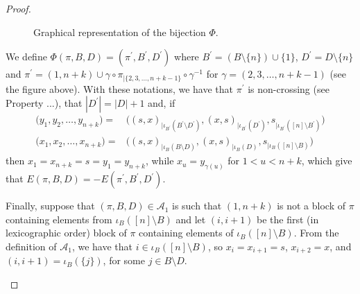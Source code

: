 \documentclass{amsart}
\begin{document}
\begin{proof}
\begin{center}
{\begin{figure}[H]
\begin{tikzpicture}
  \end{tikzpicture}
  \caption{Graphical representation of the bijection $\Phi$.}
  \label{fig:4}
  \end{figure}
}
  \end{center}
    We define
   $ \Phi(\pi, B, D) = (\pi^\prime, B^\prime, D^\prime)$
   where
   $ B^\prime = ( B \setminus \{n\} ) \cup \{1\}$,
   $ D^\prime = D \setminus \{n\} $
   and
   $ \pi^\prime  = (1, n+k) \cup \gamma \circ \pi_{| \{2, 3, \dots, n+k-1\}} \circ \gamma^{-1}$ 
   for
    $ \gamma = (2, 3, \dots, n+k-1)$ (see the figure above).
    With these notations, we have that
    $ \pi^\prime $ is non-crossing (see Property ...),
    that
     $ | D^\prime | = | D | + 1 $ and, if
    \begin{align*}
    \big( y_1, y_2, \dots, y_{n+k}\big)
    = & \big(
    (s, x)_{|\iota_{B^\prime}(B^\prime \setminus D^\prime)},
    (x, s)_{| \iota_{B^\prime}(D^\prime)}, s_{|\iota_{B^\prime} ([n]\setminus B^\prime)}
    \big)\\
     \big( x_1, x_2, \dots, x_{n+k}\big)
    = & \big(
    (s, x)_{|\iota_{B}(B \setminus D)},
    (x, s)_{| \iota_{B}(D)}, s_{|\iota_{B} ([n]\setminus B)}
    \big)
    \end{align*} 
   then
   $x_1 = x_{n+k} =s= y_1 = y_{n+k} $, 
   while
   $ x_u = y_{\gamma(u)} $ for $ 1 < u < n+k $,
   which give that
    $ E (\pi, B, D) = - E(\pi^\prime, B^\prime, D^\prime)$.
  
  Finally, suppose that
   $ (\pi, B, D) \in \mathcal{A}_1 $
    is such that $(1, n+k)$ is not a block of $\pi$ containing elements from 
    $ \iota_B([n]\setminus B)$
     and let $(i, i+1) $ be the first (in lexicographic order) block of $ \pi$ containing elements of
   $ \iota_B ([n]\setminus B )$. From the definition of $ \mathcal{A}_1 $, we have that 
   $ i \in \iota_B ([n]\setminus B) $, 
   so $ x_i = x_{i+1}= s $, $ x_{i+2} = x $, and
   $ (i,i+1) = \iota_B (\{j\}) $, for some $j \in B \setminus D $.
   \begin{center}
   	\begin{figure}[H]
\end{figure}
\end{center}
\end{proof}
\end{document}
